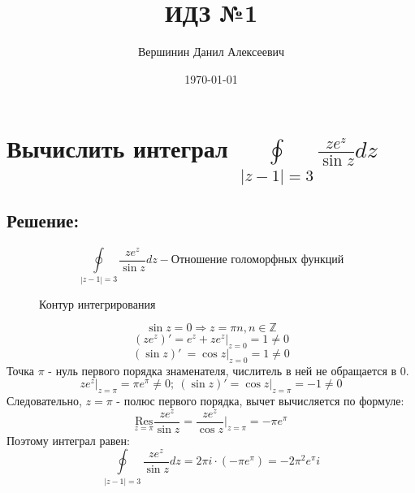 \documentclass{article}
\title{\vspace{-1cm}ИДЗ №1}
\author{Вершинин Данил Алексеевич}
\date{\today}
\begin{document}
	
	\maketitle
	\section{Вычислить интеграл $\oint\limits_{|z-1|=3} \frac{ze^z}{\sin z}dz$}
	\subsection{Решение:}
	\[\oint\limits_{|z-1|=3} \frac{ze^z}{\sin z}dz - \text{Отношение голоморфных функций}\]
	\begin{figure}[h]
		\centering
		\caption{Контур интегрирования}
		
	\end{figure}
	\newline
	\[\sin z = 0 \Rightarrow z = \pi n, n \in \mathbb{Z}\]
	\[(ze^z)' = e^z + ze^z \bigg|_{z=0} = 1 \ne 0\]
	\[(\sin z)'\ = \cos z \bigg|_{z=0} = 1 \ne 0\]
	Точка $\pi$ - нуль первого порядка знаменателя, числитель в ней не обращается в 0.
	\[ze^z \bigg|_{z=\pi} = \pi e^\pi \ne 0; \ (\sin z )' = \cos z \bigg|_{z=\pi} = -1 \ne 0\]
	Следовательно, $z=\pi$ - полюс первого порядка, вычет вычисляется по формуле:
	\[\underset{z=\pi}{\text{Res}} \frac{ze^z}{\sin z } = \frac{ze^z}{\cos z}\bigg|_{z=\pi} = -\pi e^\pi\]
	Поэтому интеграл равен:
	\[\oint\limits_{|z-1|=3} \frac{ze^z}{\sin z}dz = 2\pi i \cdot (-\pi e^\pi) =  -2\pi^2 e^\pi i\]
	
\end{document}
